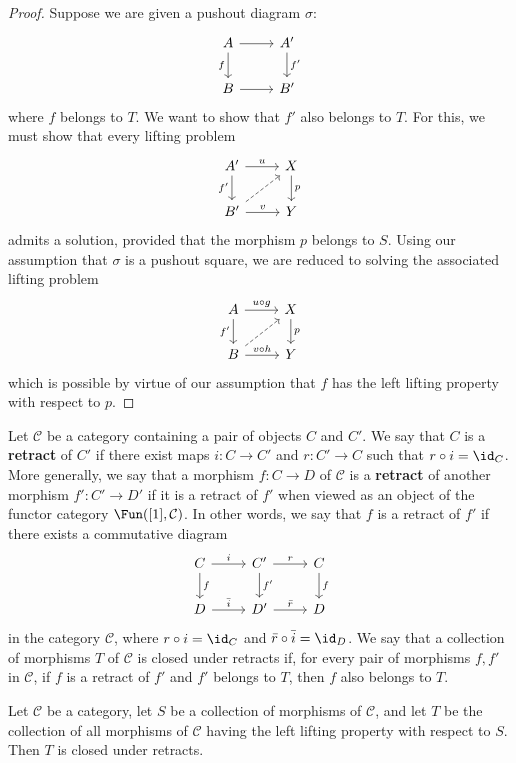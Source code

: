 \begin{proof}
Suppose we are given a pushout diagram $\sigma$:
\[\begin{tikzcd}
A\ar[r]\ar[d,swap,"f"]&A'\ar[d,"f'"]\\
B\ar[r]&B'
\end{tikzcd}\]
where $f$ belongs to $T$. We want to show that $f'$ also belongs to $T$. For this, we must show that every lifting problem
\[\begin{tikzcd}
A'\ar[r,"u"]\ar[d,swap,"f'"]&X\ar[d,"p"]\\
B'\ar[r,"v"]\ar[ru,dashed]&Y
\end{tikzcd}\]
admits a solution, provided that the morphism $p$ belongs to $S$. Using our assumption that $\sigma$ is a pushout square, we are reduced to solving the associated lifting problem
\[\begin{tikzcd}
A\ar[r,"u\circ g"]\ar[d,swap,"f'"]&X\ar[d,"p"]\\
B\ar[r,"v\circ h"]\ar[ru,dashed]&Y
\end{tikzcd}\]
which is possible by virtue of our assumption that $f$ has the left lifting property with respect to $p$.
\end{proof}
Let $\mathcal{C}$ be a category containing a pair of objects $C$ and $C'$. We say that $C$ is a \textbf{retract} of $C'$ if there exist maps $i:C\to C'$ and $r:C'\to C$ such that $r\circ i=\id_C$. More generally, we say that a morphism $f:C\to D$ of $\mathcal{C}$ is a \textbf{retract} of another morphism $f':C'\to D'$ if it is a retract of $f'$ when viewed as an object of the functor category $\Fun([1],\mathcal{C})$. In other words, we say that $f$ is a retract of $f'$ if there exists a commutative diagram
\[\begin{tikzcd}
C\ar[r,"i"]\ar[d,"f"]&C'\ar[r,"r"]\ar[d,"f'"]&C\ar[d,"f"]\\
D\ar[r,"\bar{i}"]&D'\ar[r,"\bar{r}"]&D
\end{tikzcd}\]
in the category $\mathcal{C}$, where $r\circ i=\id_C$ and $\bar{r}\circ\bar{i}=\id_D$. We say that a collection of morphisms $T$ of $\mathcal{C}$ is closed under retracts if, for every pair of morphisms $f,f'$ in $\mathcal{C}$, if $f$ is a retract of $f'$ and $f'$ belongs to $T$, then $f$ also belongs to $T$.
\begin{proposition}\label{category left lifting closed under retraction}
Let $\mathcal{C}$ be a category, let $S$ be a collection of morphisms of $\mathcal{C}$, and let $T$ be the collection of all morphisms of $\mathcal{C}$ having the left lifting property with respect to $S$. Then $T$ is closed under retracts.
\end{proposition}
